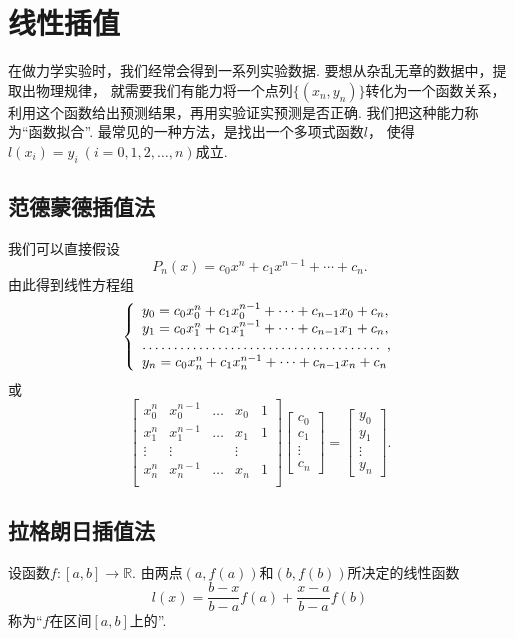 \section{线性插值}
在做力学实验时，我们经常会得到一系列实验数据.
要想从杂乱无章的数据中，提取出物理规律，
就需要我们有能力将一个点列\(\{(x_n,y_n)\}\)转化为一个函数关系，
利用这个函数给出预测结果，再用实验证实预测是否正确.
我们把这种能力称为“函数拟合”.
最常见的一种方法，是找出一个多项式函数\(l\)，
使得\(l(x_i) = y_i\ (i=0,1,2,\dotsc,n)\)成立.

\subsection{范德蒙德插值法}
我们可以直接假设\[
	P_n(x) = c_0 x^n + c_1 x^{n-1} + \dotsb + c_n.
\]
由此得到线性方程组\[
	\left\{ \begin{array}{l}
		y_0 = c_0 x_0^n + c_1 x_0^{n-1} + \dotsb + c_{n-1} x_0 + c_n, \\
		y_1 = c_0 x_1^n + c_1 x_1^{n-1} + \dotsb + c_{n-1} x_1 + c_n, \\
		\hdotsfor{1}, \\
		y_n = c_0 x_n^n + c_1 x_n^{n-1} + \dotsb + c_{n-1} x_n + c_n
	\end{array} \right.
\]
或\[
	\begin{bmatrix}
		x_0^n & x_0^{n-1} & \dots & x_0 & 1 \\
		x_1^n & x_1^{n-1} & \dots & x_1 & 1 \\
		\vdots & \vdots && \vdots \\
		x_n^n & x_n^{n-1} & \dots & x_n & 1 \\
	\end{bmatrix}
	\begin{bmatrix}
		c_0 \\ c_1 \\ \vdots \\ c_n
	\end{bmatrix}
	= \begin{bmatrix}
		y_0 \\ y_1 \\ \vdots \\ y_n
	\end{bmatrix}.
\]

\subsection{拉格朗日插值法}
\begin{definition}
设函数\(f\colon[a,b]\to\mathbb{R}\).
由两点\((a,f(a))\)和\((b,f(b))\)所决定的线性函数\[
	l(x) = \frac{b-x}{b-a} f(a) + \frac{x-a}{b-a} f(b)
\]称为“\(f\)在区间\([a,b]\)上的”.
\end{definition}

